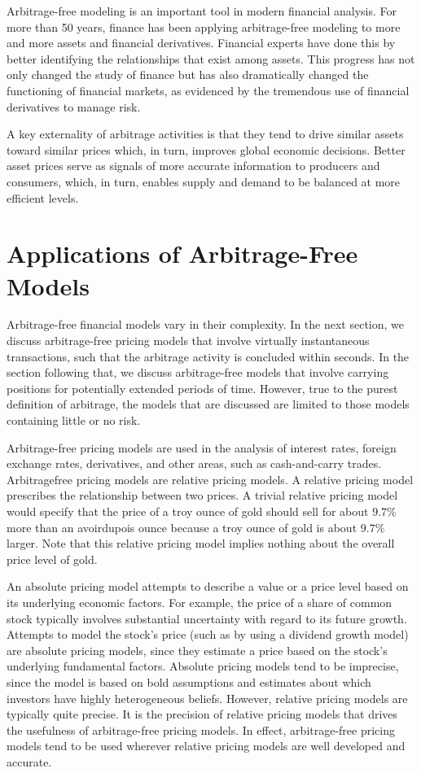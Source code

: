 \documentclass[11pt]{article}
\begin{document}
Arbitrage-free modeling is an important tool in modern financial analysis. For more than 50 years, finance has been applying arbitrage-free modeling to more and more assets and financial derivatives. Financial experts have done this by better identifying the relationships that exist among assets. This progress has not only changed the study of finance but has also dramatically changed the functioning of financial markets, as evidenced by the tremendous use of financial derivatives to manage risk.

A key externality of arbitrage activities is that they tend to drive similar assets toward similar prices which, in turn, improves global economic decisions. Better asset prices serve as signals of more accurate information to producers and consumers, which, in turn, enables supply and demand to be balanced at more efficient levels.

\section*{Applications of Arbitrage-Free Models}
Arbitrage-free financial models vary in their complexity. In the next section, we discuss arbitrage-free pricing models that involve virtually instantaneous transactions, such that the arbitrage activity is concluded within seconds. In the section following that, we discuss arbitrage-free models that involve carrying positions for potentially extended periods of time. However, true to the purest definition of arbitrage, the models that are discussed are limited to those models containing little or no risk.

Arbitrage-free pricing models are used in the analysis of interest rates, foreign exchange rates, derivatives, and other areas, such as cash-and-carry trades. Arbitragefree pricing models are relative pricing models. A relative pricing model prescribes the relationship between two prices. A trivial relative pricing model would specify that the price of a troy ounce of gold should sell for about $9.7 \%$ more than an avoirdupois ounce because a troy ounce of gold is about $9.7 \%$ larger. Note that this relative pricing model implies nothing about the overall price level of gold.

An absolute pricing model attempts to describe a value or a price level based on its underlying economic factors. For example, the price of a share of common stock typically involves substantial uncertainty with regard to its future growth. Attempts to model the stock's price (such as by using a dividend growth model) are absolute pricing models, since they estimate a price based on the stock's underlying fundamental factors. Absolute pricing models tend to be imprecise, since the model is based on bold assumptions and estimates about which investors have highly heterogeneous beliefs. However, relative pricing models are typically quite precise. It is the precision of relative pricing models that drives the usefulness of arbitrage-free pricing models. In effect, arbitrage-free pricing models tend to be used wherever relative pricing models are well developed and accurate.
\end{document}
